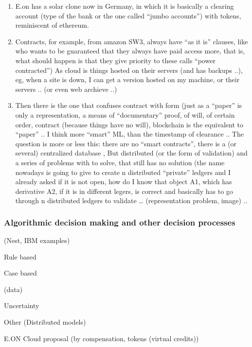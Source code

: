 \documentclass[]{book}
\theoremstyle{definition}
\theoremstyle{definition}
\theoremstyle{definition}
\theoremstyle{remark}
\begin{document}
\begin{enumerate}
\def\labelenumi{\alph{enumi})}
\setcounter{enumi}{5}
\item
  E.on has a solar clone now in Germany, in which it is basically a
  clearing account (type of the bank or the one called ``jumbo
  accounts'') with tokens, reminiscent of ethereum.
\item
  Contracts, for example, from amazon SW3, always have ``as it is''
  clauses, like who wants to be guaranteed that they always have paid
  access more, that is, what should happen is that they give priority to
  these calls ``power contracted'') As cloud is things hosted on their
  servers (and has backups ..), eg, when a site is down, I can get a
  version hosted on my machine, or their servers .. (or even web
  archieve ..)
\item
  Then there is the one that confuses contract with form (just as a
  ``paper'' is only a representation, a means of ``documentary'' proof,
  of will, of certain order, contract (because things have no will),
  blockchain is the equivalent to ``paper'' .. I think more ``smart''
  ML, than the timestamp of clearance .. The question is more or less
  this: there are no ``smart contracts'', there is a (or several)
  centralized database , But distributed (or the form of validation) and
  a series of problems with to solve, that still has no solution (the
  name nowadays is going to give to create n distributed ``private''
  ledgers and I already asked if it is not open, how do I know that
  object A1, which has derivative A2, if it is in different legers, is
  correct and basically has to go through n distributed ledgers to
  validate \ldots{} (representation problem, image) ..
\end{enumerate}

\subsubsection{Algorithmic decision making and other decision
processes}\label{algorithmic-decision-making-and-other-decision-processes}

(Nest, IBM examples)

Rule based

Case based

(data)

Uncertainty

Other (Distributed models)

E.ON Cloud proposal (by compensation, tokens (virtual credits))
\end{document}
